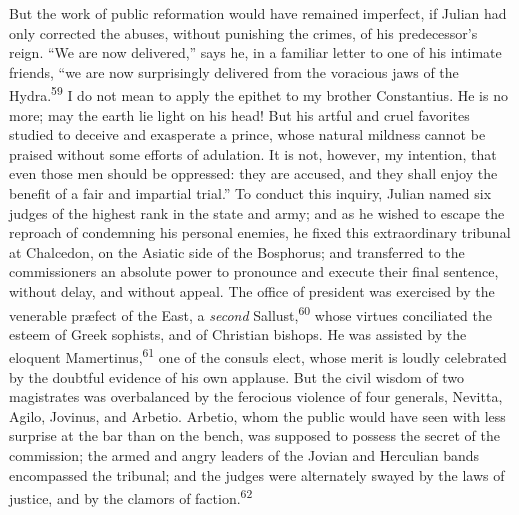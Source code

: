 

But the work of public reformation would have remained imperfect,
if Julian had only corrected the abuses, without punishing the
crimes, of his predecessor’s reign. “We are now delivered,” says
he, in a familiar letter to one of his intimate friends, “we are
now surprisingly delivered from the voracious jaws of the Hydra.\textsuperscript{59}
I do not mean to apply the epithet to my brother Constantius.
He is no more; may the earth lie light on his head! But his
artful and cruel favorites studied to deceive and exasperate a
prince, whose natural mildness cannot be praised without some
efforts of adulation. It is not, however, my intention, that even
those men should be oppressed: they are accused, and they shall
enjoy the benefit of a fair and impartial trial.” To conduct this
inquiry, Julian named six judges of the highest rank in the state
and army; and as he wished to escape the reproach of condemning
his personal enemies, he fixed this extraordinary tribunal at
Chalcedon, on the Asiatic side of the Bosphorus; and transferred
to the commissioners an absolute power to pronounce and execute
their final sentence, without delay, and without appeal. The
office of president was exercised by the venerable præfect of the
East, a \textit{second} Sallust,\textsuperscript{60} whose virtues conciliated the esteem
of Greek sophists, and of Christian bishops. He was assisted by
the eloquent Mamertinus,\textsuperscript{61} one of the consuls elect, whose merit
is loudly celebrated by the doubtful evidence of his own
applause. But the civil wisdom of two magistrates was
overbalanced by the ferocious violence of four generals, Nevitta,
Agilo, Jovinus, and Arbetio. Arbetio, whom the public would have
seen with less surprise at the bar than on the bench, was
supposed to possess the secret of the commission; the armed and
angry leaders of the Jovian and Herculian bands encompassed the
tribunal; and the judges were alternately swayed by the laws of
justice, and by the clamors of faction.\textsuperscript{62}

